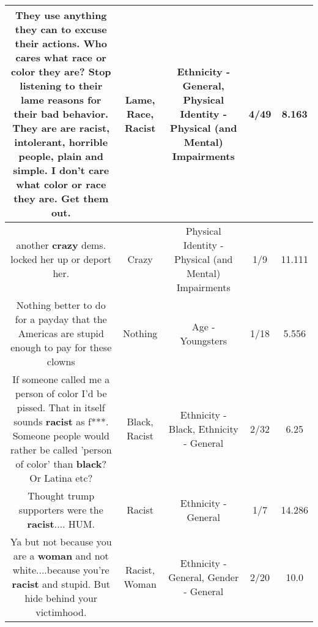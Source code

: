 \documentclass[11pt]{article}
\newlength\mylength
\begin{document}
\begin{center}
\begin{longtable}{|C{.65\mylength}|C{.30\mylength}|C{.12\mylength}|C{.12\mylength}|C{.12\mylength}|}
  \small They use anything they can to excuse their actions. Who cares what \textbf{race} or color they are? Stop listening to their \textbf{lame} reasons for their bad behavior. They are are \textbf{racist}, intolerant, horrible people, plain and simple. I don't care what color or \textbf{race} they are. Get them out.\normalsize   & Lame, Race, Racist & Ethnicity - General, Physical Identity - Physical (and Mental) Impairments & 4/49 & 8.163 \\  \hline
  \small another \textbf{crazy} dems. locked her up or deport her.\normalsize   & Crazy & Physical Identity - Physical (and Mental) Impairments & 1/9 & 11.111 \\  \hline
  \small Nothing better to do for a payday that the Americas are stupid enough to pay for these clowns\normalsize   & Nothing & Age - Youngsters & 1/18 & 5.556 \\  \hline
  \small If someone called me a person of color I'd be pissed. That in itself sounds \textbf{racist} as f***. Someone people would rather be called 'person of color' than \textbf{black}? Or Latina etc?\normalsize   & Black, Racist & Ethnicity - Black, Ethnicity - General & 2/32 & 6.25 \\  \hline
  \small Thought trump supporters were the \textbf{racist}.... HUM.\normalsize   & Racist & Ethnicity - General & 1/7 & 14.286 \\  \hline
  \small Ya but not because you are a \textbf{woman} and not white....because you're \textbf{racist} and stupid. But hide behind your victimhood.\normalsize   & Racist, Woman & Ethnicity - General, Gender - General & 2/20 & 10.0 \\  \hline

\end{longtable}
\end{center}
\end{document}
